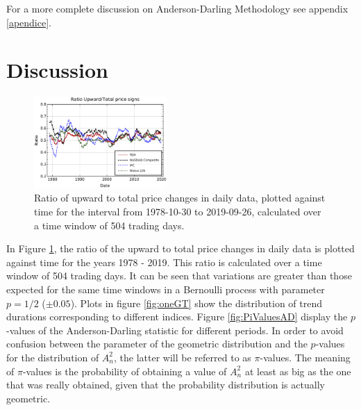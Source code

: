 \documentclass[a4paper]{jpconf}
\begin{document}
For a more complete discussion on Anderson-Darling Methodology see appendix \ref{apendice}.

\section{Discussion}
\label{discussion}

\begin{figure}
\begin{center}
\includegraphics[width=0.45\textwidth]{img/sign_ratios}
\end{center}
\caption{\small \label{fig:simetria}Ratio of upward to total price changes in daily data, plotted against time for the interval from 1978-10-30 to 2019-09-26, calculated over a time window of 504 trading days.}
\end{figure}

In Figure \ref{fig:simetria}, the ratio of the upward to total price changes in daily data is plotted against time for the years 1978 - 2019. This ratio is calculated over a time window of 504 trading days. It can be seen that variations are greater than those expected for the same time windows in a Bernoulli process with parameter $p = 1/2$ ($\pm{0.05}$). Plots in figure \ref{fig:oneGT} show the distribution of trend durations corresponding to different indices. Figure \ref{fig:PiValuesAD} display the $p$-values of the Anderson-Darling statistic for different periods. In order to avoid confusion between the parameter of the geometric distribution and the $p$-values for the distribution of $A^{2}_{n}$, the latter will be referred to as $\pi$-values. The meaning of $\pi$-values is the probability of obtaining a value of $A^{2}_{n}$ at least as big as the one that was really obtained, given that the probability distribution is actually geometric.
\end{document}
